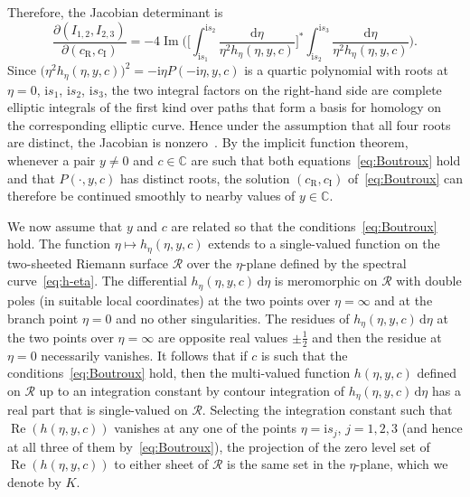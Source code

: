 Therefore, the Jacobian determinant is
\begin{equation*}
\frac{\partial (I_{1,2},I_{2,3})}{\partial (c_\mathrm{R},c_\mathrm{I})}
= -4\operatorname{Im}\bigg(\bigg[\int_{\mathrm{i} s_1}^{\mathrm{i} s_2}\frac{\mathrm{d}\eta}{\eta^2h_\eta(\eta,y,c)}\bigg]^*
\int_{\mathrm{i} s_2}^{\mathrm{i} s_3}\frac{\mathrm{d}\eta}{\eta^2h_\eta(\eta,y,c)}\bigg).
\end{equation*}
Since $\bigl(\eta^2h_\eta(\eta,y,c)\bigr)^2 = -\mathrm{i}\eta P(-\mathrm{i}\eta,y,c)$ is a quartic polynomial with roots at $\eta=0$, $\mathrm{i} s_1$, $\mathrm{i} s_2$, $\mathrm{i} s_3$, the two integral factors on the right-hand side are complete elliptic integrals of the first kind over paths that form a basis for homology on the corresponding elliptic curve. Hence under the assumption that all four roots are distinct, the Jacobian is nonzero~\cite[Corollary 1]{Dubrovin81}. By the implicit function theorem, whenever a pair $y\neq 0$ and $c\in\mathbb{C}$ are such that both equations~\eqref{eq:Boutroux} hold and that $P(\cdot,y,c)$ has distinct roots, the solution $(c_\mathrm{R},c_\mathrm{I})$ of~\eqref{eq:Boutroux} can therefore be continued smoothly to nearby values of $y\in\mathbb{C}$.

We now assume that $y$ and $c$ are related so that the conditions~\eqref{eq:Boutroux} hold. The function $\eta\mapsto h_\eta(\eta,y,c)$ extends to a single-valued function on the two-sheeted Riemann surface $\mathcal{R}$ over the $\eta$-plane defined by the spectral curve~\eqref{eq:h-eta}. The differential $h_\eta(\eta,y,c)\,\mathrm{d}\eta$ is meromorphic on $\mathcal{R}$ with double poles (in suitable local coordinates) at the two points over $\eta=\infty$ and at the branch point $\eta=0$ and no other singularities. The residues of $h_\eta(\eta,y,c)\,\mathrm{d}\eta$ at the two points over $\eta=\infty$ are opposite real values $\pm\frac{1}{2}$ and then the residue at $\eta=0$ necessarily vanishes. It follows that if $c$ is such that the conditions~\eqref{eq:Boutroux} hold, then the multi-valued function $h(\eta,y,c)$ defined on $\mathcal{R}$ up to an integration constant by contour integration of $h_\eta(\eta,y,c)\,\mathrm{d}\eta$ has a real part that is single-valued on $\mathcal{R}$. Selecting the integration constant such that $\operatorname{Re}(h(\eta,y,c))$ vanishes at any one of the points $\eta=\mathrm{i} s_j$, $j=1,2,3$ (and hence at all three of them by~\eqref{eq:Boutroux}), the projection of the zero level set of $\operatorname{Re}(h(\eta,y,c))$ to either sheet of $\mathcal{R}$ is the same set in the $\eta$-plane, which we denote by $K$.

